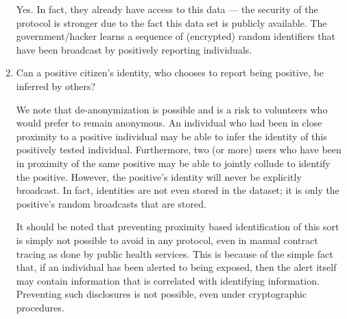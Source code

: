 \documentclass{article}
\begin{document}
\begin{enumerate}[leftmargin=*]
Yes. In fact, they already have access to this data --- the security of the protocol is stronger due to the fact this data set is publicly available. The government/hacker learns a sequence of (encrypted) random identifiers that have been broadcast by positively reporting individuals. 
\fi

\iffalse
The government/hacker learns a sequence of random identifiers (and public health message) that have been broadcast, over time, in proximity of individuals who tested positive. The location of the individual who tested positive could be inferred if these random identifiers were collected separately at specific locations. The individual remains otherwise anonymous. The security of the system relies on the fact this data set can be made public.
\fi

\item Can a positive citizen's identity, who chooses to report being positive, be inferred by others? 

We note that de-anonymization is possible and is a risk to volunteers who would prefer to remain anonymous. An individual who had been in close proximity to a positive individual may be able to infer the identity of this positively tested individual. 
Furthermore, two (or more) users who have been in proximity of the same positive may be able to jointly collude to identify the positive.
However, the positive's identity will never be explicitly broadcast. In fact, identities are not even stored in the dataset; it is only the positive's random broadcasts that are stored.

It should be noted that preventing proximity based identification of this sort is simply not possible to avoid in any protocol, even in manual contract tracing as done by public health services. This is because of the simple fact that, if an individual has been alerted to being exposed,  then the alert itself may contain information that is correlated with identifying information.  Preventing such disclosures is not possible, even under cryptographic procedures. 


\iffalse
\item Can a malicious citizen eavesdrop on the Bluetooth signals\footnote{The signals we mean here are those signals that broadcast under the mobile tracing protocol.} that my phone is broadcasting publicly (to ping other nearby phones) and then use this information in any way against me or any other citizens?

No, this is not possible. Your broadcasts look like random numbers (gibberish) to any other users who eavesdrop, so the malicious citizen will only hear random numbers. These numbers convey by themselves no information, and cryptographic mechanisms prevent them being used for other malicious goals. For example, to frame you to be a positive subject and trigger an exposure warning. 
\fi

\end{enumerate}
\end{document}
